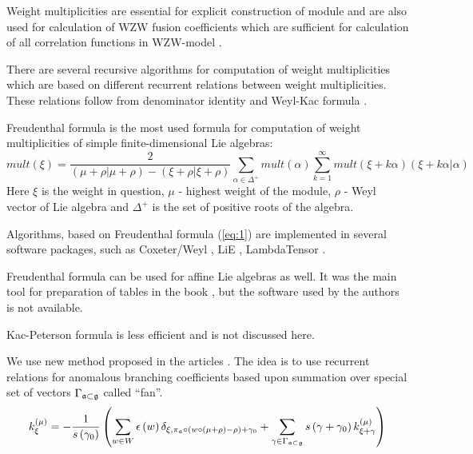 \documentclass[a4paper,12pt]{article}
\theoremstyle{definition} \newtheorem{Def}{Definition}
\begin{document}
Weight multiplicities are essential for explicit construction of
module and are also used for calculation of WZW fusion coefficients
which are sufficient for calculation of all correlation functions in
WZW-model \cite{Walton:1999xc}.

There are several recursive algorithms for computation of weight
multiplicities which are based on different recurrent relations
between weight multiplicities. These relations follow from denominator
identity and Weyl-Kac formula \cite{kac1990idl,wakimoto2001idl}. 

Freudenthal formula is the most used formula for computation of weight
multiplicities of simple finite-dimensional Lie algebras:
\begin{equation}
  \label{eq:1}
   mult(\xi)=\frac{2}{(\mu+\rho|\mu+\rho)-(\xi+\rho|\xi+\rho)}\sum_{\alpha\in\Delta^{+}} mult(\alpha) \sum_{k=1}^{\infty}mult(\xi+k\alpha)(\xi+k\alpha|\alpha)
\end{equation}
Here $\xi$ is the weight in question, $\mu$ - highest weight of the
module, $\rho$ - Weyl vector of Lie algebra and $\Delta^{+}$ is the
set of positive roots of the algebra.

Algorithms, based on Freudenthal formula (\ref{eq:1}) are implemented
in several software packages, such as Coxeter/Weyl
\cite{stembridge1995mps}, LiE \cite{vanleeuwen1994lsp}, LambdaTensor
\cite{fischbacher2002ilp}.

Freudenthal formula can be used for affine Lie algebras as well. It was
the main tool for preparation of tables in the book
\cite{kass1990ala}, but the software used by the authors is not
available. 

Kac-Peterson formula is less efficient and is not discussed here.

We use new method proposed in the articles
\cite{lyakhovsky1996rra,lyakhovsky2007dub,ilyin812pbc,kulish4sfa}. The
idea is to use recurrent relations for anomalous branching
coefficients based upon summation over special
set of vectors $\Gamma_{\frak{a}\subset \frak{g}} $ called ``fan''.
\begin{equation}
  \label{recurrent-relation}
  k_{\xi }^{\left( \mu \right) }=-\frac{1}{s\left( \gamma _{0}\right) }\left(
    \sum_{w\in W}\epsilon \left( w\right) \delta _{\xi ,\pi _{\frak{a}}\circ
      \left( w\circ (\mu +\rho )-\rho \right) +\gamma _{0}}+\sum_{\gamma \in
      \Gamma _{\frak{a}\subset \frak{g}}}s\left( \gamma +\gamma _{0}\right) k_{\xi
      +\gamma }^{\left( \mu \right) }\right)   
\end{equation}
\end{document}

